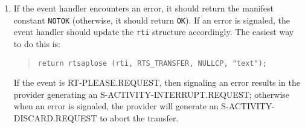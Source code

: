 \begin{enumerate}
\item	If the event handler encounters an error, it should return the
	manifest constant \verb"NOTOK" (otherwise, it should return
	\verb"OK").
	If an error is signaled, the event handler should update the
	\verb"rti" structure accordingly.  The easiest way to do this is:
\begin{quote}\small\begin{verbatim}
return rtsaplose (rti, RTS_TRANSFER, NULLCP, "text");
\end{verbatim}\end{quote}
If the event is {\sf RT-PLEASE.REQUEST},
then signaling an error results in the provider generating an
{\sf S-ACTIVITY-INTERRUPT.REQUEST};
otherwise when an error is signaled, the provider will generate an
{\sf S-ACTIVITY-DISCARD.REQUEST\/} to abort the transfer.
\end{enumerate}

